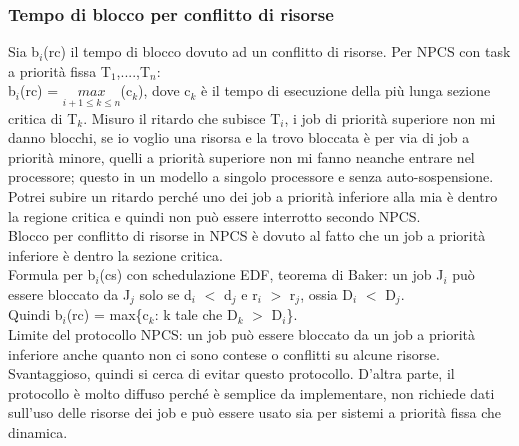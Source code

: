 \documentclass[12pt, oneside]{extbook}
\begin{document}
\subsubsection{Tempo di blocco per conflitto di risorse}
Sia b$_{i}$(rc) il tempo di blocco dovuto ad un conflitto di risorse. Per NPCS con task a priorità fissa T$_{1}$,....,T$_{n}$:\\
b$_{i}$(rc) = $\underset{i+1 \leq k \leq n}{max}$(c$_{k}$), dove c$_{k}$ è il tempo di esecuzione della più lunga sezione critica di T$_{k}$. Misuro il ritardo che subisce T$_{i}$, i job di priorità superiore non mi danno blocchi, se io voglio una risorsa e la trovo bloccata è per via di job a priorità minore, quelli a priorità superiore non mi fanno neanche entrare nel processore; questo in un modello a singolo processore e senza auto-sospensione.\\ Potrei subire un ritardo perché uno dei job a priorità inferiore alla mia è dentro la regione critica e quindi non può essere interrotto secondo NPCS.\\ Blocco per conflitto di risorse in NPCS è dovuto al fatto che un job a priorità inferiore è dentro la sezione critica.\\ Formula per b$_{i}$(cs) con schedulazione EDF, teorema di Baker: un job J$_{i}$ può essere bloccato da J$_{j}$ solo se d$_{i}$ $<$ d$_{j}$ e r$_{i}$ $>$ r$_{j}$, ossia D$_{i}$ $<$ D$_{j}$.\\ Quindi b$_{i}$(rc) = max\{c$_{k}$: k tale che D$_{k}$ $>$ D$_{i}$\}.\\ Limite del protocollo NPCS: un job può essere bloccato da un job a priorità inferiore anche quanto non ci sono contese o conflitti su alcune risorse. Svantaggioso, quindi si cerca di evitar questo protocollo. D'altra parte, il protocollo è molto diffuso perché è semplice da implementare, non richiede dati sull'uso delle risorse dei job e può essere usato sia per sistemi a priorità fissa che dinamica.
\end{document}
